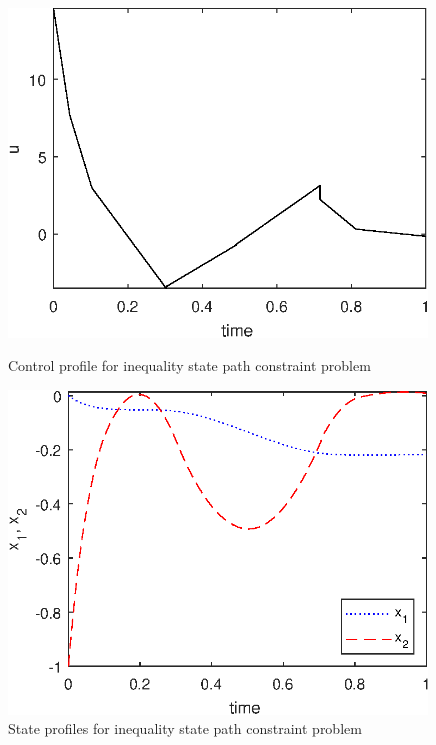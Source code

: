 \begin{figure}[htb]
\begin{minipage}[t]{0.5\linewidth}
\centering
\includegraphics[width=0.99\textwidth]{examples/problem3/graphs/u_627a.eps}
\caption[Tutorial example 4: control profile]{Control profile for
  inequality state path constraint problem} \label{fig:prob3_u}
\end{minipage}
\begin{minipage}[t]{0.5\linewidth}
\centering
\includegraphics[width=0.99\textwidth,clip]{examples/problem3/graphs/x12_627a.eps}
\caption[Tutorial example 4: state profiles]{State profiles for
  inequality state path constraint problem} \label{fig:prob3_x}

\end{minipage}
\end{figure}
